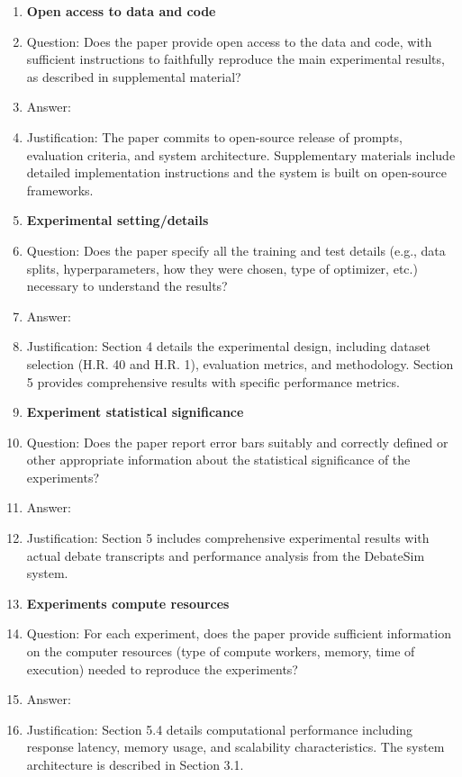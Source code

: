 \documentclass{article}
\begin{document}
\begin{enumerate}
\item {\bf Open access to data and code}
    \item[] Question: Does the paper provide open access to the data and code, with sufficient instructions to faithfully reproduce the main experimental results, as described in supplemental material?
    \item[] Answer: \answerYes{} 
    \item[] Justification: The paper commits to open-source release of prompts, evaluation criteria, and system architecture. Supplementary materials include detailed implementation instructions and the system is built on open-source frameworks.
    
\item {\bf Experimental setting/details}
    \item[] Question: Does the paper specify all the training and test details (e.g., data splits, hyperparameters, how they were chosen, type of optimizer, etc.) necessary to understand the results?
    \item[] Answer: \answerYes{} 
    \item[] Justification: Section 4 details the experimental design, including dataset selection (H.R. 40 and H.R. 1), evaluation metrics, and methodology. Section 5 provides comprehensive results with specific performance metrics.
    
\item {\bf Experiment statistical significance}
    \item[] Question: Does the paper report error bars suitably and correctly defined or other appropriate information about the statistical significance of the experiments?
    \item[] Answer: \answerYes{} 
    \item[] Justification: Section 5 includes comprehensive experimental results with actual debate transcripts and performance analysis from the DebateSim system.
    
\item {\bf Experiments compute resources}
    \item[] Question: For each experiment, does the paper provide sufficient information on the computer resources (type of compute workers, memory, time of execution) needed to reproduce the experiments?
    \item[] Answer: \answerYes{} 
    \item[] Justification: Section 5.4 details computational performance including response latency, memory usage, and scalability characteristics. The system architecture is described in Section 3.1.
    

\end{enumerate}
\end{document}
